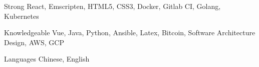 

\begin{cvskills}

  \cvskill
    {Strong} %
    {React, Emscripten, HTML5, CSS3, Docker, Gitlab CI, Golang, Kubernetes} %

  \cvskill
    {Knowledgeable} %
    {Vue, Java, Python, Ansible, Latex, Bitcoin, Software Architecture Design, AWS, GCP} %

  \cvskill
    {Languages} %
    {Chinese, English} %

\end{cvskills}
